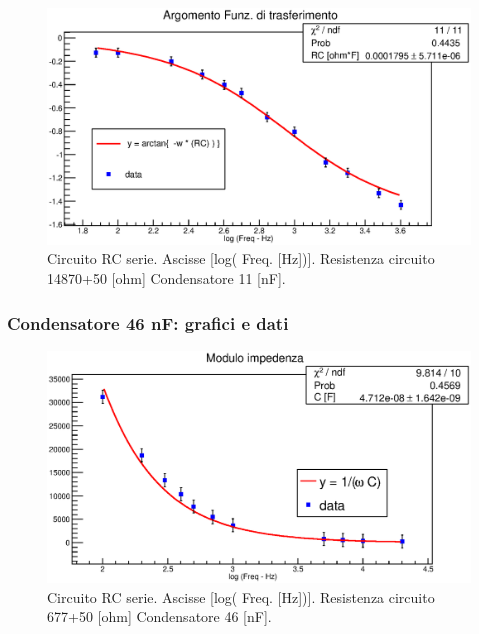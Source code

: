 \begin{figure}[H]
\centering
\includegraphics[scale=0.7]{Grafici/C3_P1_ArgFdT_cond1.eps}
\caption{
Circuito RC serie.
Ascisse [log( Freq. [Hz])].
Resistenza circuito 14870+50 [ohm]
Condensatore 11 [nF].
}
\label{fig:C3_P1_ArgFdT_cond1}
\end{figure}













\break
\subsubsection*{Condensatore 46 nF: grafici e dati}

\begin{figure}[H]
\centering
\includegraphics[scale=0.7]{Grafici/C3_P1_ModImp_cond2.eps}
\caption{
Circuito RC serie.
Ascisse [log( Freq. [Hz])].
Resistenza circuito 677+50 [ohm]
Condensatore 46 [nF].
}
\label{fig:C3_P1_ModImp_cond2}
\end{figure}

